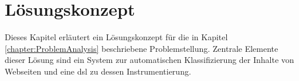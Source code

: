 \chapter{Lösungskonzept}
    \label{chapter:SolutionConcept}
    Dieses Kapitel erläutert ein Lösungskonzept für die in Kapitel \ref{chapter:ProblemAnalysis} beschriebene Problemstellung.
    Zentrale Elemente dieser Lösung sind ein System zur automatischen Klassifizierung der Inhalte von Webseiten
    und eine \gls{dsl} zu dessen Instrumentierung.

    
    
    
    
    
    
    
    
